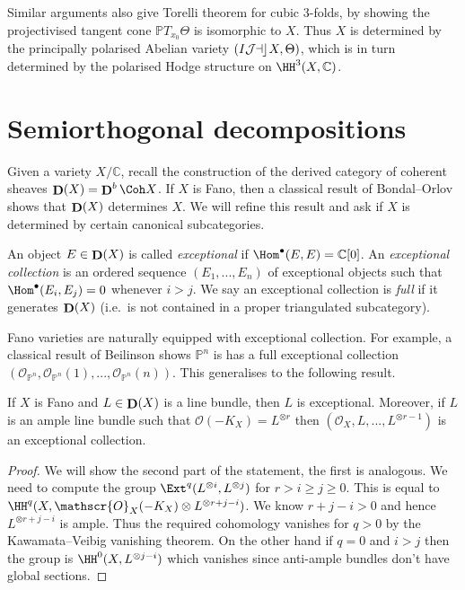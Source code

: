 Similar arguments also give Torelli theorem for cubic 3-folds, by
showing the projectivised tangent cone \(\mathbb{P}T_{x_0}\Theta\) is isomorphic
to \(X\). Thus \(X\) is determined by the principally polarised Abelian variety
\((\mathop{I\mathcal{J\kern -0.5pt a\kern -0.5pt c\kern -1pt}} X,\Theta)\), which is in turn determined by the polarised Hodge
structure on \(\HH^3(X,\mathbb{C})\).

\section{Semiorthogonal decompositions}
Given a variety \(X/\mathbb{C}\), recall the construction of the derived
category of coherent sheaves \(\deri(X)=\deri^b\Coh X\). If \(X\) is Fano, then
a classical result of Bondal--Orlov shows that \(\mathop{\mathbf{D}}(X)\) determines \(X\). We
will refine this result and ask if \(X\) is determined by certain canonical
subcategories.

\begin{definition}
    An object \(E\in \mathop{\mathbf{D}}(X)\) is called \textit{exceptional} if
    \(\Hom^{\bullet}(E,E)=\mathbb{C}[0]\). An \textit{exceptional collection} is
    an ordered sequence \((E_1,...,E_n)\) of exceptional objects such that
    \(\Hom^\bullet (E_i,E_j)=0\) whenever \(i>j\). We say an exceptional
    collection is \textit{full} if it generates \(\mathop{\mathbf{D}}(X)\) (i.e.\ is not
    contained in a proper triangulated subcategory).
\end{definition}

Fano varieties are naturally equipped with exceptional collection. For example,
a classical result of Beilinson shows \(\mathbb{P}^n\) is has a full exceptional
collection \((\mathscr{O}_{\mathbb{P}^n}, \mathscr{O}_{\mathbb{P}^n}(1),...,
\mathscr{O}_{\mathbb{P}^n}(n))\). This generalises to the following result.

\begin{lemma}
    If \(X\) is Fano and \(L\in \mathop{\mathbf{D}}(X)\) is a line bundle, then \(L\) is
    exceptional. Moreover, if \(L\) is an ample line bundle such that
    \(\mathscr{O}(-K_X)=L^{\otimes r}\) then
    \((\mathscr{O}_X, L,...,L^{\otimes r-1})\) is an
    exceptional collection.
    \begin{proof}
        We will show the second part of the statement, the first is analogous.
        We need to compute the group \(\Ext^q(L^{\otimes i},L^{\otimes j})\) for
        \(r> i\geq j \geq 0\). This is equal to \(\HH^q(X,
        \mathscr{O}_X(-K_X)\otimes L^{\otimes r+j-i})\). We know
        \(r+j-i>0\) and hence \(L^{\otimes r+j-i}\) is ample. Thus the required
        cohomology vanishes for \(q>0\) by the Kawamata--Veibig vanishing
        theorem. On the other hand if \(q=0\) and \(i>j\) then the group is
        \(\HH^0(X,L^{\otimes j-i})\) which vanishes since anti-ample bundles
        don't have global sections.
    \end{proof}
\end{lemma}

